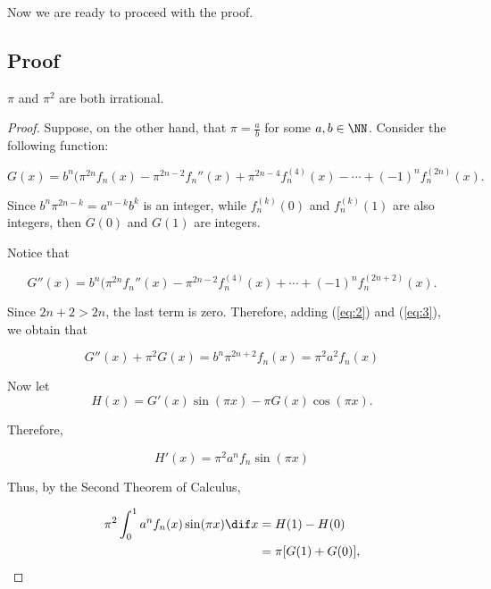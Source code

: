 \documentclass[11pt]{scrartcl}
\begin{document}
Now we are ready to proceed with the proof.

\subsection{Proof}


\begin{theorem}
$\pi$ and $\pi^2$ are both irrational.
\end{theorem}

\begin{proof}
  Suppose, on the other hand, that $\pi = \frac{a}{b}$ for some
  $a, b\in \NN$. Consider the following function:

  \begin{equation}
    \label{eq:2}
    G(x) = b^n(\pi^{2n}f_n(x) - \pi^{2n-2}f_n''(x) + \pi^{2n-4}f_n^{(4)}(x) - \cdots + (-1)^nf_n^{(2n)}(x).
  \end{equation}

  Since $b^n\pi^{2n-k} = a^{n-k}b^k$ is an integer, while
  $f_n^{(k)}(0)$ and $f_n^{(k)}(1)$ are also integers, then $G(0)$ and
  $G(1)$ are integers.

  Notice that

  \begin{equation}
    \label{eq:3}
    G''(x) = b^n(\pi^{2n}f_n''(x) - \pi^{2n-2}f_n^{(4)}(x) + \cdots  + (-1)^nf_n^{(2n+2)}(x).
  \end{equation}

  Since $2n+2 > 2n$, the last term is zero. Therefore, adding
  (\ref{eq:2}) and (\ref{eq:3}), we obtain that

  \begin{equation}
G''(x) + \pi^2G(x) = b^n\pi^{2n+2}f_n(x) = \pi^2a^2f_n(x)
\end{equation}

Now let
\begin{equation}
H(x) = G'(x) \sin(\pi x)  - \pi G(x) \cos(\pi x).
\end{equation}

Therefore,

\begin{equation}
H'(x) = \pi^{2}a^nf_n\sin(\pi x)
\end{equation}

Thus, by the Second Theorem of Calculus,


\begin{align}
  \pi^2\int_0^1a^nf_n(x)\sin(\pi x) \dif x &= H(1) - H(0)\\
  &= \pi[G(1) + G(0)],
\end{align}


\end{proof}
\end{document}
